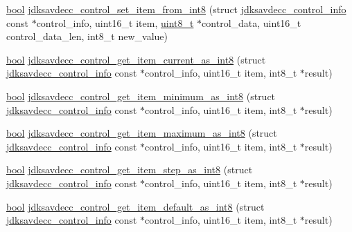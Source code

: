 \begin{DoxyCompactItemize}
\item 
\hyperlink{avb__gptp_8h_af6a258d8f3ee5206d682d799316314b1}{bool} \hyperlink{group__aem__control__value__helpers_ga50faaec0c801e7775fbf43c5d43f06a8}{jdksavdecc\+\_\+control\+\_\+set\+\_\+item\+\_\+from\+\_\+int8} (struct \hyperlink{structjdksavdecc__control__info}{jdksavdecc\+\_\+control\+\_\+info} const $\ast$control\+\_\+info, uint16\+\_\+t item, \hyperlink{stdint_8h_aba7bc1797add20fe3efdf37ced1182c5}{uint8\+\_\+t} $\ast$control\+\_\+data, uint16\+\_\+t control\+\_\+data\+\_\+len, int8\+\_\+t new\+\_\+value)
\item 
\hyperlink{avb__gptp_8h_af6a258d8f3ee5206d682d799316314b1}{bool} \hyperlink{group__aem__control__value__helpers_gad3f43228a44d8c46eaaba8574f8a8824}{jdksavdecc\+\_\+control\+\_\+get\+\_\+item\+\_\+current\+\_\+as\+\_\+int8} (struct \hyperlink{structjdksavdecc__control__info}{jdksavdecc\+\_\+control\+\_\+info} const $\ast$control\+\_\+info, uint16\+\_\+t item, int8\+\_\+t $\ast$result)
\item 
\hyperlink{avb__gptp_8h_af6a258d8f3ee5206d682d799316314b1}{bool} \hyperlink{group__aem__control__value__helpers_ga741f4c619dc48a3ae941848f6bf4811e}{jdksavdecc\+\_\+control\+\_\+get\+\_\+item\+\_\+minimum\+\_\+as\+\_\+int8} (struct \hyperlink{structjdksavdecc__control__info}{jdksavdecc\+\_\+control\+\_\+info} const $\ast$control\+\_\+info, uint16\+\_\+t item, int8\+\_\+t $\ast$result)
\item 
\hyperlink{avb__gptp_8h_af6a258d8f3ee5206d682d799316314b1}{bool} \hyperlink{group__aem__control__value__helpers_ga653da326d1197842c82fbb0989716603}{jdksavdecc\+\_\+control\+\_\+get\+\_\+item\+\_\+maximum\+\_\+as\+\_\+int8} (struct \hyperlink{structjdksavdecc__control__info}{jdksavdecc\+\_\+control\+\_\+info} const $\ast$control\+\_\+info, uint16\+\_\+t item, int8\+\_\+t $\ast$result)
\item 
\hyperlink{avb__gptp_8h_af6a258d8f3ee5206d682d799316314b1}{bool} \hyperlink{group__aem__control__value__helpers_ga963adee00f0391879760801b16168be5}{jdksavdecc\+\_\+control\+\_\+get\+\_\+item\+\_\+step\+\_\+as\+\_\+int8} (struct \hyperlink{structjdksavdecc__control__info}{jdksavdecc\+\_\+control\+\_\+info} const $\ast$control\+\_\+info, uint16\+\_\+t item, int8\+\_\+t $\ast$result)
\item 
\hyperlink{avb__gptp_8h_af6a258d8f3ee5206d682d799316314b1}{bool} \hyperlink{group__aem__control__value__helpers_ga30f50a5f5f90fc499a9a89dc346ed038}{jdksavdecc\+\_\+control\+\_\+get\+\_\+item\+\_\+default\+\_\+as\+\_\+int8} (struct \hyperlink{structjdksavdecc__control__info}{jdksavdecc\+\_\+control\+\_\+info} const $\ast$control\+\_\+info, uint16\+\_\+t item, int8\+\_\+t $\ast$result)

\end{DoxyCompactItemize}

